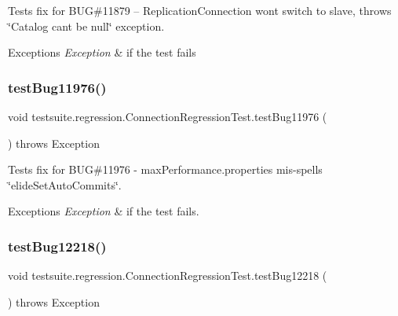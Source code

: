 Tests fix for B\+UG\#11879 -- Replication\+Connection won\textquotesingle{}t switch to slave, throws \char`\"{}\+Catalog can\textquotesingle{}t be null\char`\"{} exception.


\begin{DoxyExceptions}{Exceptions}
{\em Exception} & if the test fails \\
\hline
\end{DoxyExceptions}
\mbox{\label{classtestsuite_1_1regression_1_1_connection_regression_test_a9c63a889bf88b7f4ec84d455614d8da0}} 
\subsubsection{\texorpdfstring{test\+Bug11976()}{testBug11976()}}
{\footnotesize\ttfamily void testsuite.\+regression.\+Connection\+Regression\+Test.\+test\+Bug11976 (\begin{DoxyParamCaption}{ }\end{DoxyParamCaption}) throws Exception}

Tests fix for B\+UG\#11976 -\/ max\+Performance.\+properties mis-\/spells \char`\"{}elide\+Set\+Auto\+Commits\char`\"{}.


\begin{DoxyExceptions}{Exceptions}
{\em Exception} & if the test fails. \\
\hline
\end{DoxyExceptions}
\mbox{\label{classtestsuite_1_1regression_1_1_connection_regression_test_add3171d1526d38f6597d2bd384d44cf0}} 
\subsubsection{\texorpdfstring{test\+Bug12218()}{testBug12218()}}
{\footnotesize\ttfamily void testsuite.\+regression.\+Connection\+Regression\+Test.\+test\+Bug12218 (\begin{DoxyParamCaption}{ }\end{DoxyParamCaption}) throws Exception}

